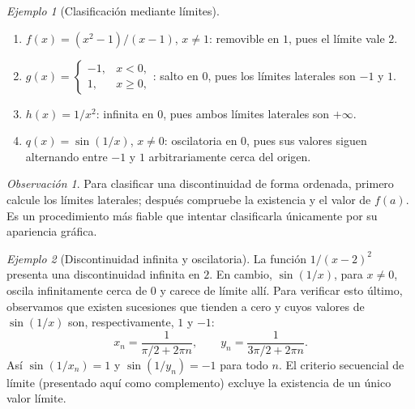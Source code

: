 \documentclass[12pt]{article}
\theoremstyle{remark}
\newtheorem{observacion}{Observación}
\newtheorem{ejemplo}{Ejemplo}
\begin{document}
\begin{ejemplo}[Clasificación mediante límites]
\begin{enumerate}[label=(\alph*)]
\item $f(x)=(x^2-1)/(x-1)$, $x\ne1$: removible en $1$, pues el límite vale $2$.
\item $g(x)=\begin{cases}-1,&x<0,\\1,&x\ge0,\end{cases}$: salto en $0$, pues los límites laterales son $-1$ y $1$.
\item $h(x)=1/x^2$: infinita en $0$, pues ambos límites laterales son $+\infty$.
\item $q(x)=\sin(1/x)$, $x\ne0$: oscilatoria en $0$, pues sus valores siguen alternando entre $-1$ y $1$ arbitrariamente cerca del origen.
\end{enumerate}
\end{ejemplo}

\begin{center}
\end{center}

\begin{observacion}
Para clasificar una discontinuidad de forma ordenada, primero calcule los límites laterales; después compruebe la existencia y el valor de $f(a)$. Es un procedimiento más fiable que intentar clasificarla únicamente por su apariencia gráfica.
\end{observacion}

\begin{ejemplo}[Discontinuidad infinita y oscilatoria]
La función $1/(x-2)^2$ presenta una discontinuidad infinita en $2$. En cambio, $\sin(1/x)$, para $x\ne0$, oscila infinitamente cerca de $0$ y carece de límite allí. Para verificar esto último, observamos que existen sucesiones que tienden a cero y cuyos valores de $\sin(1/x)$ son, respectivamente, $1$ y $-1$:
\[
 x_n=\frac1{\pi/2+2\pi n},\qquad
 y_n=\frac1{3\pi/2+2\pi n}.
\]
Así $\sin(1/x_n)=1$ y $\sin(1/y_n)=-1$ para todo $n$. El criterio secuencial de límite (presentado aquí como complemento) excluye la existencia de un único valor límite.
\end{ejemplo}
\end{document}
